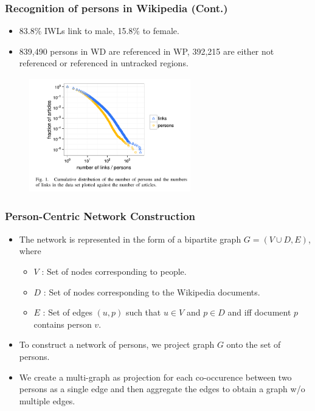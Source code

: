 \documentclass[10pt, compress]{beamer}
\begin{document}
\begin{frame}[fragile]
	\frametitle{Recognition of persons in Wikipedia (Cont.)}
\begin{itemize}
\item 83.8\% IWLs link to male, 15.8\% to female.
\item 839,490 persons in WD are referenced in WP, 392,215 are either not referenced or referenced in untracked regions.
\end{itemize}
\begin{figure}
  \centering
 \includegraphics[width=7cm,height=5cm]{Fig1.png}
\end{figure}
\end{frame}

\begin{frame}[fragile]
	\frametitle{Person-Centric Network Construction}
\begin{itemize}
\item The network is represented in the form of a bipartite graph \(G = (V \cup D,E)\), where
\begin{itemize}
\item \(V\) : Set of nodes corresponding to people.
\item \(D\) : Set of nodes corresponding to the Wikipedia documents.
\item \(E\) : Set of edges \((u,p)\) such that \(u \in V\) and \(p \in D\) and iff document \(p\) contains person \(v\).
\end{itemize}
\item To construct a network of persons, we project graph \(G\) onto the set of persons.
\item We create a multi-graph as projection for each co-occurence between two persons as a single edge and then aggregate the edges to obtain a graph w/o multiple edges.
\end{itemize}
\end{frame}
\end{document}
